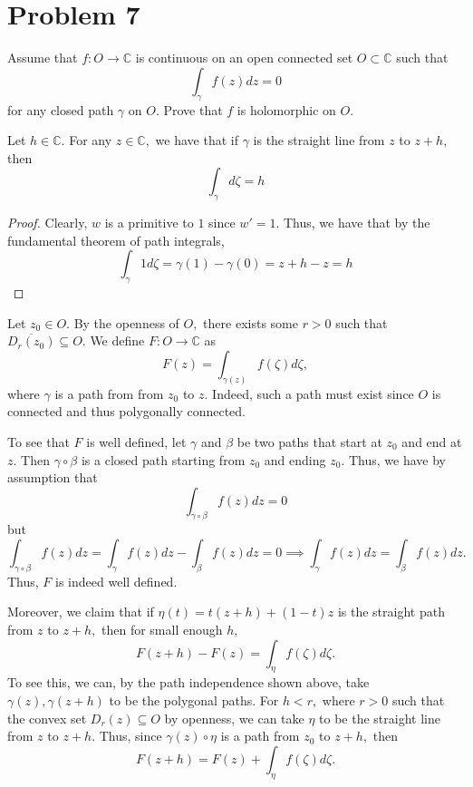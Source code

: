 \documentclass[11pt]{article}
\newcommand{\bbC}{\mathbb{C}}
\begin{document}
\section*{Problem 7}
\begin{problem}
Assume that $f: O\to \bbC$ is continuous on an open connected set $O\subset \bbC$ such that 
\[\int_\gamma f(z)dz = 0\] for any closed path $\gamma$ on $O.$ Prove that $f$ is holomorphic on $O.$     
\end{problem}
\begin{solution}
\begin{lemma}
    Let $h \in \bbC.$ For any $z\in \bbC,$ we have that if $\gamma$ is the straight line from $z$ to $z + h,$ then 
    \[\int_\gamma d\zeta = h\]
\end{lemma}
\begin{proof}
    Clearly, $w$ is a primitive to $1$ since $w' = 1.$ Thus, we have that by the fundamental theorem of path integrals,
    \[\int_\gamma 1 d\zeta = \gamma(1) - \gamma(0) = z + h - z = h\]
\end{proof}
    Let $z_0 \in O.$  By the openness of $O,$ there exists some $r>0$ such that $\overline{D_r(z_0)}\subseteq O.$ We define $F: O\to \bbC$ as 
    \[F(z) = \int_{\gamma(z)} f(\zeta)d\zeta,\] where $\gamma$ is a path from from $z_0$ to $z.$ Indeed, such a path must exist since $O$ is connected and thus polygonally connected. 

To see that $F$ is well defined, let $\gamma$ and $\beta$ be two paths that start at $z_0$ and end at $z.$ Then $\gamma \circ \beta$ is a closed path starting from $z_0$ and ending $z_0.$ Thus, we have by assumption that
\[\int_{\gamma \circ \beta} f(z)dz = 0\] but 
\[\int_{\gamma \circ \beta} f(z)dz= \int_\gamma f(z)dz - \int_\beta f(z)dz  =0 \implies \int_\gamma f(z)dz =\int_\beta f(z)dz.\] Thus, $F$ is indeed well defined.

Moreover, we claim that if $\eta(t) = t(z+h) + (1-t)z$ is the straight path from $z$ to $z+h,$ then for small enough $h,$
\[F(z+h) - F(z) = \int_\eta f(\zeta)d\zeta.\] To see this, we can, by the path independence shown above, take $\gamma(z), \gamma(z + h)$ to be the polygonal paths. For $h< r,$ where $r>0$ such that the convex set $D_r(z)\subseteq O$ by openness, we can take $\eta$ to be the straight line from $z$ to $z +h.$ Thus, since $\gamma(z)\circ \eta$ is a path from $z_0$ to $z + h,$ then 
\[F(z+h) = F(z) + \int_\eta f(\zeta)d\zeta.\]
    

\end{solution}
\end{document}
